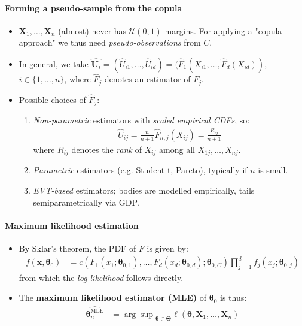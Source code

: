 \documentclass[a4paper,landscape,8pt,fleqn]{scrartcl}
\renewcommand{\emph}[1]{\textbf{#1}}
\begin{document}
\begin{multicols*}{3}
\paragraph{Forming a pseudo-sample from the copula}
\begin{itemize}
\item $\bm X_1, \ldots, \bm X_n$ (almost) never has $\mathcal{U}(0,1)$ margins. For applying a "copula approach" we thus need \textit{pseudo-observations} from $C$.
\item In general, we take $\hat{\bm U_i} = (\hat U_{i1}, \ldots, \hat U_{id}) = (\hat F_1(X_{i1}, \ldots, \hat F_d(X_{id}))$, $i \in \lbrace 1, \ldots, n \rbrace$, where $\hat F_j$ denotes an estimator of $F_j$.
\item Possible choices of $\hat F_j$:
\begin{enumerate}
\item \textit{Non-parametric} estimators with \textit{scaled empirical CDFs}, so:
\begin{align*}
\hat U_{ij} = \frac{n}{n+1} \hat F_{n,j}(X_{ij}) = \frac{R_{ij}}{n+1}
\end{align*}
where $R_{ij}$ denotes the \textit{rank} of $X_{ij}$ among all $X_{1j}, \ldots, X_{nj}$.
\item \textit{Parametric} estimators (e.g. Student-t, Pareto), typically if $n$ is small.
\item \textit{EVT-based} estimators; bodies are modelled empirically, tails semiparametrically via GDP.
\end{enumerate}
\end{itemize}

\paragraph{Maximum likelihood estimation}
\begin{itemize}
\item By Sklar's theorem, the PDF of $F$ is given by:
\begin{align*}
f(\bm x, \bm \theta_0) &= c(F_1(x_1; \bm \theta_{0,1}), \ldots, F_d(x_d; \bm \theta_{0,d}); \bm \theta_{0,C}) \prod_{j=1}^d f_j(x_j; \bm \theta_{0,j})
\end{align*}
from which the \textit{log-likelihood} follows directly.
\item The \emph{maximum likelihood estimator (MLE)} of $\bm \theta_0$ is thus:
\begin{align*}
\hat{\bm \theta_n^\text{MLE}} &= {\arg\sup}_{\bm \theta \in \bm \Theta} \ell(\bm \theta, \bm X_1, \ldots, \bm X_n)
\end{align*}
\end{itemize}


\end{multicols*}
\end{document}
